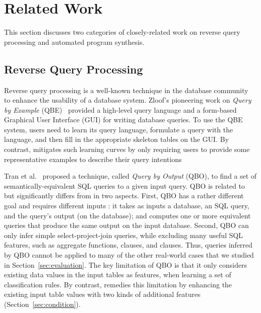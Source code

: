
\section{Related Work}
\label{sec:related}

This section discusses two categories
of closely-related work on reverse query processing 
and automated program synthesis.


\subsection{Reverse Query Processing}

Reverse query processing is a well-known technique in the database
community~\cite{Zloof:1975, Tran:2009, DasSarma:2010} to
enhance the usability of a database system. 
Zloof's pioneering work on \textit{Query by Example} (QBE)~\cite{Zloof:1975}
provided a high-level query language and a
form-based Graphical User Interface (GUI) for
writing database queries. To use the QBE system, 
users need to learn its query language,
formulate a query with the language, and then fill in
the appropriate skeleton tables on the GUI.
By contrast, \ourtool mitigates such learning curves
by only requiring users to provide some representative
examples to describe their query intentions




Tran et al.~\cite{Tran:2009} proposed a technique,
called \textit{Query by Output} (QBO), 
to find a set of semantically-equivalent SQL queries
to a given input query. QBO is related to but
significantly differs from \ourtool in two aspects.
First, QBO has a rather different goal and requires
different inputs : it takes as inputs a database,
an SQL query, and the query's output (on the database); and computes
one or more equivalent queries that produce the
same output on the input database.
Second, QBO can only infer simple select-project-join queries,
while excluding many useful SQL features, such as aggregate
functions,  clauses, and 
clauses. Thus, queries inferred by QBO cannot be applied to many of the other
real-world cases that we studied in Section~\ref{sec:evaluation}.
The key limitation of QBO is that it
only considers existing data values
in the input tables as features, when learning
a set of classification rules. 
By contrast, \ourtool remedies this limitation by enhancing
the existing input table values with two kinds of
additional features (Section~\ref{sec:condition}).


